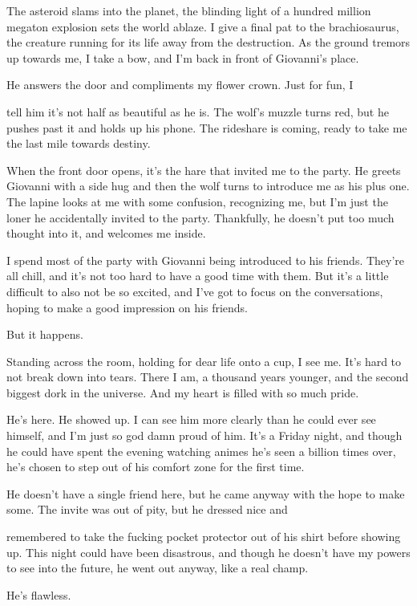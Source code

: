 The asteroid slams into the planet, the blinding light of a hundred
million megaton explosion sets the world ablaze. I give a final pat to
the brachiosaurus, the creature running for its life away from the
destruction. As the ground tremors up towards me, I take a bow, and I'm
back in front of Giovanni's place.

He answers the door and compliments my flower crown. Just for fun, I

tell him it's not half as beautiful as he is. The wolf's muzzle turns
red, but he pushes past it and holds up his phone. The rideshare is
coming, ready to take me the last mile towards destiny.

When the front door opens, it's the hare that invited me to the party.
He greets Giovanni with a side hug and then the wolf turns to introduce
me as his plus one. The lapine looks at me with some confusion,
recognizing me, but I'm just the loner he accidentally invited to the
party. Thankfully, he doesn't put too much thought into it, and welcomes
me inside.

I spend most of the party with Giovanni being introduced to his friends.
They're all chill, and it's not too hard to have a good time with them.
But it's a little difficult to also not be so excited, and I've got to
focus on the conversations, hoping to make a good impression on his
friends.

But it happens.

Standing across the room, holding for dear life onto a cup, I see me.
It's hard to not break down into tears. There I am, a thousand years
younger, and the second biggest dork in the universe. And my heart is
filled with so much pride.

He's here. He showed up. I can see him more clearly than he could ever
see himself, and I'm just so god damn proud of him. It's a Friday night,
and though he could have spent the evening watching animes he's seen a
billion times over, he's chosen to step out of his comfort zone for the
first time.

He doesn't have a single friend here, but he came anyway with the hope
to make some. The invite was out of pity, but he dressed nice and

remembered to take the fucking pocket protector out of his shirt before
showing up. This night could have been disastrous, and though he doesn't
have my powers to see into the future, he went out anyway, like a real
champ.

He's flawless.

